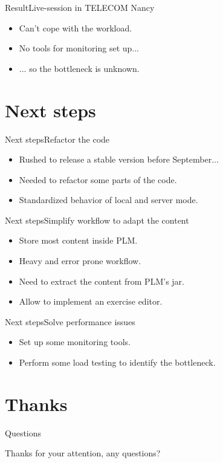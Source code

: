 \documentclass{beamer}
\begin{document}

\begin{frame}{Result}{Live-session in TELECOM Nancy}
  \begin{itemize}
  \item {
    Can't cope with the workload.
    \pause
  }
  \item {
    No tools for monitoring set up...
    \pause
  }
  \item {
    ... so the bottleneck is unknown.
  }
  \end{itemize}
\end{frame}

\section{Next steps}

\begin{frame}{Next steps}{Refactor the code}
  \begin{itemize}
  \item {
    Rushed to release a stable version before September...
  }
  \item {
    Needed to refactor some parts of the code.
  }
  \item {
    Standardized behavior of local and server mode.
  }
  \end{itemize}
\end{frame}

\begin{frame}{Next steps}{Simplify workflow to adapt the content}
  \begin{itemize}
  \item {
    Store most content inside PLM.
  }
  \item {
    Heavy and error prone workflow.
  }
  \item {
    Need to extract the content from PLM's jar.
  }
  \item {
    Allow to implement an exercise editor.
  }
  \end{itemize}
\end{frame}
  
\begin{frame}{Next steps}{Solve performance issues}
  \begin{itemize}
  \item {
    Set up some monitoring tools.
  }
  \item {
    Perform some load testing to identify the bottleneck.
  }
  \end{itemize}
\end{frame}

\section*{Thanks}

\begin{frame}{Questions}
  \begin{center}
    Thanks for your attention, any questions?
  \end{center}
\end{frame}
\end{document}
